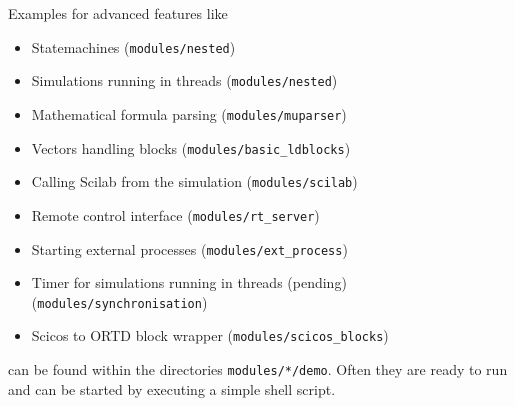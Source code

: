 \documentclass[serif,9pt,xcolor=dvipsnames]{beamer}
\begin{document}
\begin{frame}
Examples for advanced features like 

  \begin{itemize}
\item Statemachines (\texttt{modules/nested})
\item Simulations running in threads (\texttt{modules/nested})
\item Mathematical formula parsing (\texttt{modules/muparser})
\item Vectors handling blocks (\texttt{modules/basic\_ldblocks})
\item Calling Scilab from the simulation (\texttt{modules/scilab})
\item Remote control interface (\texttt{modules/rt\_server})
\item Starting external processes (\texttt{modules/ext\_process})
\item Timer for simulations running in threads (pending) (\texttt{modules/synchronisation})
\item Scicos to ORTD block wrapper (\texttt{modules/scicos\_blocks})
  \end{itemize}

  can be found within the directories \texttt{modules/*/demo}. Often they are ready to run and can be started by executing a simple shell script.
\end{frame}
\end{document}

